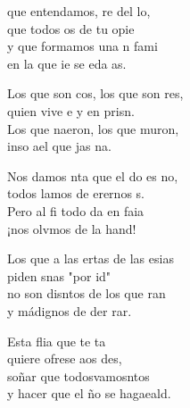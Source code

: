 \begin{cancion}%
	 que entendamos, re del lo,\\
	que todos os de tu opie\\
	y que formamos una n fami\\
	en la que ie se eda as. \\
	\begin{chorus}%
	Los que son cos, los que son res,\\
	quien vive e y en prisn. \\
	Los que naeron, los que muron,\\
	inso ael que jas na.  \\
	\end{chorus}%
	Nos damos nta que el do es no,\\
	todos lamos de erernos s.\\
	Pero al fi todo da en faia\\
	¡nos olvmos de la hand!\\
	\begin{chorus}%
	Los que a las ertas de las esias\\
	piden snas "por id"\\
	no son disntos de los que ran\\
	y  mádignos de der rar.\\
	\end{chorus}%
	Esta flia que  te ta\\
	quiere ofrese aos des,\\
	soñar que todosvamosntos\\
	y hacer que el ño se hagaeald.\\

\end{cancion}
